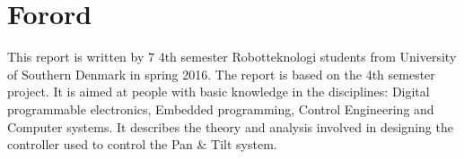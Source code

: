 \section*{Forord}

This report is written by 7 4th semester Robotteknologi students from University of Southern Denmark in spring 2016. The report is based on the 4th semester project.
It is aimed at people with basic knowledge in the disciplines: Digital programmable electronics, Embedded programming, Control Engineering and Computer systems.
It describes the theory and analysis involved in designing the controller used to control the Pan \& Tilt system.